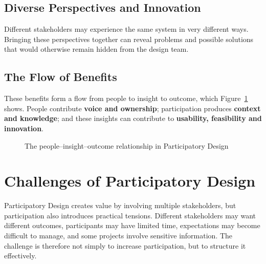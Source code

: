 \documentclass[a4paper,12pt]{article}
\begin{document}
\subsection{Diverse Perspectives and Innovation}

Different stakeholders may experience the same system in very different
ways. Bringing these perspectives together can reveal problems and possible
solutions that would otherwise remain hidden from the design team.


\subsection{The Flow of Benefits}

These benefits form a flow from people to insight to outcome, which
Figure~\ref{fig:peopleinsightoutcome} shows. People contribute \textbf{voice and ownership}; participation produces
\textbf{context and knowledge}; and these insights can contribute to
\textbf{usability, feasibility and innovation}.

\begin{figure}[H]
\centering
{}
\caption{The people--insight--outcome relationship in Participatory Design}
\label{fig:peopleinsightoutcome}
\end{figure}

\section{Challenges of Participatory Design}
\label{sec:challenges}

Participatory Design creates value by involving multiple stakeholders, but
participation also introduces practical tensions. Different stakeholders may
want different outcomes, participants may have limited time, expectations
may become difficult to manage, and some projects involve sensitive
information. The challenge is therefore not simply to increase participation,
but to structure it effectively.
\end{document}
